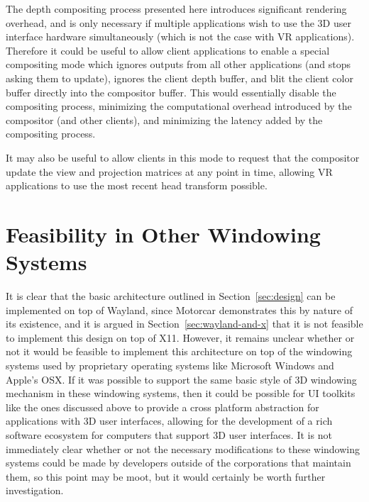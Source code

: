 The depth compositing process presented here introduces significant rendering overhead, and is only necessary if multiple applications wish to use the 3D user interface hardware simultaneously (which is not the case with VR applications). Therefore it could be useful to allow client applications to enable a special compositing mode which ignores outputs from all other applications (and stops asking them to update), ignores the client depth buffer, and blit the client color buffer directly into the compositor buffer. This would essentially disable the compositing process, minimizing the computational overhead introduced by the compositor (and other clients), and minimizing the latency added by the compositing process.

It may also be useful to allow clients in this mode to request that the compositor update the view and projection matrices at any point in time, allowing VR applications to use the most recent head transform possible. 


\section{Feasibility in Other Windowing Systems}
It is clear that the basic architecture outlined in Section~\ref{sec:design} can be implemented on top of Wayland, since Motorcar demonstrates this by nature of its existence, and it is argued in Section~\ref{sec:wayland-and-x} that it is not feasible to implement this design on top of X11. However, it remains unclear whether or not it would be feasible to implement this architecture on top of the windowing systems used by proprietary operating systems like Microsoft Windows and Apple's OSX. If it was possible to support the same basic style of 3D windowing mechanism in these windowing systems, then it could be possible for UI toolkits like the ones discussed above to provide a cross platform abstraction for applications with 3D user interfaces, allowing for the development of a rich software ecosystem for computers that support 3D user interfaces. It is not immediately clear whether or not the necessary modifications to these windowing systems could be made by developers outside of the corporations that maintain them, so this point may be moot, but it would certainly be worth further investigation.

